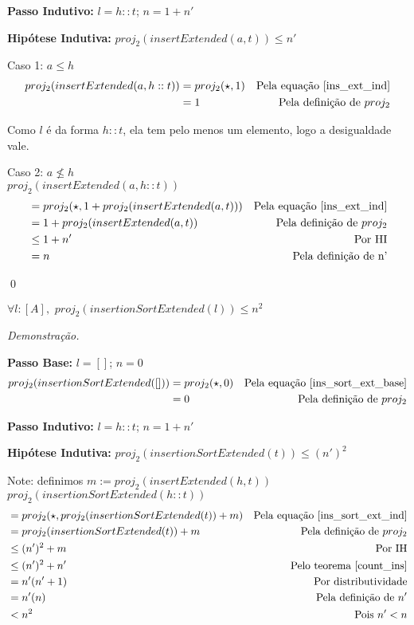 \documentclass[12pt, oneside, a4paper,english,brazil]{abntex2}
\begin{document}
\textbf{Passo Indutivo: } $l = h :: t$; $n = 1 + n'$

\textbf{Hip\'otese Indutiva: } $proj_{2}(insertExtended(a, t)) \le n'$

Caso 1: $a \le h$
\begin{align*}
  proj_{2}(insertExtended(a, h :: t)) &= proj_{2}(\star, 1) &\text{Pela equa\c{c}\~ao \ref{ins_ext_ind}} \\
  &= 1 &\text{Pela defini\c{c}\~ao de } proj_2
\end{align*}

Como $l$ \'e da forma $h :: t$, ela tem pelo menos um elemento, logo a desigualdade vale.

Caso 2: $a \not\le h$ \\

$proj_{2}(insertExtended(a, h :: t))$
\begin{align*}
   &= proj_{2}(\star, 1 + proj_{2}(insertExtended(a, t))) &\text{Pela equa\c{c}\~ao \ref{ins_ext_ind}} \\
   &= 1 + proj_{2}(insertExtended(a, t)) &\text{Pela defini\c{c}\~ao de } proj_2 \\
   &\le 1 + n' &\text{Por HI} \\
   &= n &\text{Pela defini\c{c}\~ao de n'}
\end{align*}

\qed

\begin{teorema}
  $\forall l : [A], \,\, proj_{2}(insertionSortExtended(l)) \le n^{2}$
\end{teorema}

\noindent \textit{Demonstra\c{c}\~ao.}

\textbf{Passo Base: } $l = []$; $n = 0$
\begin{align*}
  proj_{2}(insertionSortExtended([])) &= proj_{2}(\star, 0) &\text{Pela equa\c{c}\~ao \ref{ins_sort_ext_base}} \\
  &= 0 &\text{Pela defini\c{c}\~ao de } proj_2
\end{align*}

\textbf{Passo Indutivo: } $l = h :: t$; $n = 1 + n'$

\textbf{Hip\'otese Indutiva: } $proj_{2}(insertionSortExtended(t)) \le (n')^{2}$

Note: definimos $m := proj_{2}(insertExtended(h, t))$ \\

$proj_{2}(insertionSortExtended(h :: t))$
\begin{align*}
   &= proj_{2}(\star, proj_{2}(insertionSortExtended(t)) + m) &\text{Pela equa\c{c}\~ao \ref{ins_sort_ext_ind}} \\
                                             &= proj_{2}(insertionSortExtended(t)) + m &\text{Pela defini\c{c}\~ao de } proj_{2} \\
   &\le (n')^{2} + m &\text{Por IH} \\
   &\le (n')^{2} + n' &\text{Pelo teorema \ref{count_ins}} \\
   &=n'(n' + 1) &\text{Por distributividade} \\
   &=n'(n) &\text{Pela defini\c{c}\~ao de $n'$} \\
  &< n^{2} &\text{Pois $n' < n$}
\end{align*}
\end{document}
